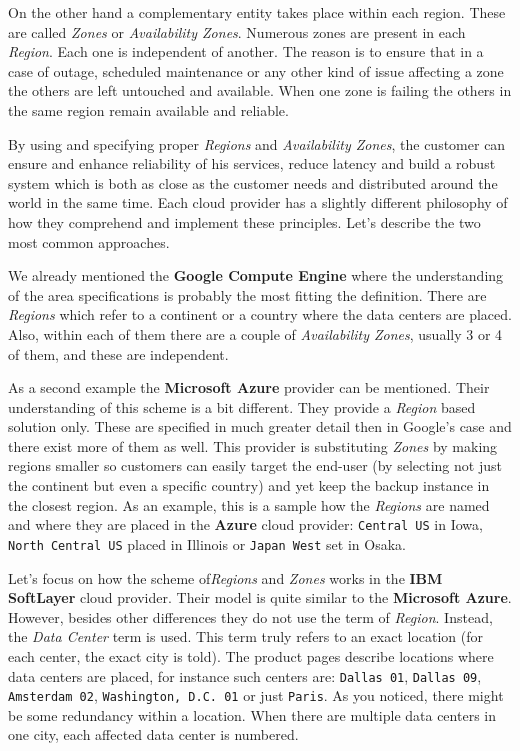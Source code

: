 On the other hand a complementary entity takes place within each region. These are called \emph{Zones} or \emph{Availability Zones}. Numerous zones are present in each \emph{Region}. Each one is independent of another. The reason is to ensure that in a case of outage, scheduled maintenance or any other kind of issue affecting a zone the others are left untouched and available. When one zone is failing the others in the same region remain available and reliable.

By using and specifying proper \emph{Regions} and \emph{Availability Zones}, the customer can ensure and enhance reliability of his services, reduce latency and build a robust system which is both as close as the customer needs and distributed around the world in the same time. Each cloud provider has a slightly different philosophy of how they comprehend and implement these principles. Let's describe the two most common approaches.

We already mentioned the \textbf{Google Compute Engine} where the understanding of the area specifications is probably the most fitting the definition. There are \emph{Regions} which refer to a continent or a country where the data centers are placed. Also, within each of them there are a couple of \emph{Availability Zones}, usually 3 or 4 of them, and these are independent.

As a second example the \textbf{Microsoft Azure} provider can be mentioned. Their understanding of this scheme is a bit different. They provide a \emph{Region} based solution only\cite{azure}. These are specified in much greater detail then in Google's case and there exist more of them as well. This provider is substituting \emph{Zones} by making regions smaller so customers can easily target the end-user (by selecting not just the continent but even a specific country) and yet keep the backup instance in the closest region. As an example, this is a sample how the \emph{Regions} are named and where they are placed in the \textbf{Azure} cloud provider: \texttt{Central US} in Iowa, \texttt{North Central US} placed in Illinois or \texttt{Japan West} set in Osaka.

Let's focus on how the scheme of\emph{Regions} and \emph{Zones} works in the \textbf{IBM SoftLayer} cloud provider. Their model is quite similar to the \textbf{Microsoft Azure}. However, besides other differences they do not use the term of \emph{Region}. Instead, the \emph{Data Center} term is used. This term truly refers to an exact location (for each center, the exact city is told). The product pages describe locations where data centers are placed\cite{softlayer_datacenters}, for instance such centers are: \texttt{Dallas 01}, \texttt{Dallas 09}, \texttt{Amsterdam 02}, \texttt{Washington, D.C. 01} or just \texttt{Paris}. As you noticed, there might be some redundancy within a location. When there are multiple data centers in one city, each affected data center is numbered.

